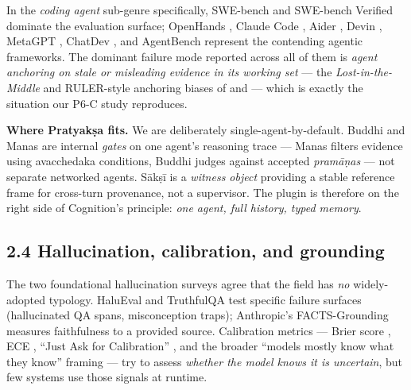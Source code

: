 In the \emph{coding agent} sub-genre specifically, SWE-bench \citep{jimenez2024swebench} and SWE-bench Verified \citep{openai2024sweverified} dominate the evaluation surface; OpenHands \citep{wang2024openhands}, Claude Code \citep{anthropic2025claudecode}, Aider \citep{aider2024}, Devin \citep{cognition2024devin}, MetaGPT \citep{hong2024metagpt}, ChatDev \citep{chen2024chatdev}, and AgentBench \citep{liu2023agentbench} represent the contending agentic frameworks. The dominant failure mode reported across all of them is \emph{agent anchoring on stale or misleading evidence in its working set} --- the \emph{Lost-in-the-Middle} and RULER-style anchoring biases of \citet{liu2023lostmiddle} and \citet{hsieh2024ruler} --- which is exactly the situation our P6-C study reproduces.

\textbf{Where Pratyakṣa fits.} We are deliberately single-agent-by-default. Buddhi and Manas are internal \emph{gates} on one agent's reasoning trace --- Manas filters evidence using avacchedaka conditions, Buddhi judges against accepted \emph{pramāṇas} --- not separate networked agents. Sākṣī is a \emph{witness object} providing a stable reference frame for cross-turn provenance, not a supervisor. The plugin is therefore on the right side of Cognition's principle: \emph{one agent, full history, typed memory}.

\subsection{2.4 Hallucination, calibration, and grounding}\label{hallucination-calibration-and-grounding}

The two foundational hallucination surveys \citep{ji2023hallusurvey, huang2024hallucinationsurvey} agree that the field has \emph{no} widely-adopted typology. HaluEval \citep{li2023halueval} and TruthfulQA \citep{lin2022truthfulqa} test specific failure surfaces (hallucinated QA spans, misconception traps); Anthropic's FACTS-Grounding \citep{anthropic2024facts} measures faithfulness to a provided source. Calibration metrics --- Brier score \citep{brier1950score}, ECE \citep{naeini2015ece, guo2017calibration}, ``Just Ask for Calibration'' \citep{tian2023justask}, and the broader ``models mostly know what they know'' framing \citep{kadavath2022know} --- try to assess \emph{whether the model knows it is uncertain}, but few systems use those signals at runtime.

